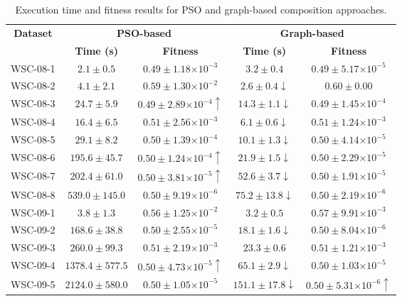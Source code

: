 \documentclass{llncs}
\providecommand{\e}[1]{\ensuremath{\times 10^{#1}}}
\begin{document}
\begin{table}[h]
\centering
\caption{Execution time and fitness results for PSO and graph-based composition approaches.}
\label{tab:results}
\begin{tabular}{|c|c|c|c|c|}
\hline
\multirow{2}{*}{{\bf Dataset}} & \multicolumn{2}{c|}{{\bf PSO-based}}               & \multicolumn{2}{c|}{{\bf Graph-based}}                     \\ \cline{2-5} 
                               & {\bf Time (s)}    & {\bf Fitness}                  & {\bf Time (s)}            & {\bf Fitness}                  \\ \hline
WSC-08-1                       & $2.1 \pm 0.5$     & $0.49 \pm 1.18\e{-3}$          & $3.2 \pm 0.4$             & $0.49 \pm 5.17\e{-5}$          \\ \hline
WSC-08-2                       & $4.1 \pm 2.1$     & $0.59 \pm 1.30\e{-2}$          & $2.6 \pm 0.4 \downarrow$  & $0.60 \pm 0.00$                \\ \hline
WSC-08-3                       & $24.7 \pm 5.9$    & $0.49 \pm 2.89\e{-4} \uparrow$ & $14.3 \pm 1.1 \downarrow$ & $0.49 \pm 1.45\e{-4}$          \\ \hline
WSC-08-4                       & $16.4 \pm 6.5$    & $0.51 \pm 2.56\e{-3}$          & $6.1 \pm 0.6 \downarrow$  & $0.51 \pm 1.24\e{-3}$          \\ \hline
WSC-08-5                       & $29.1 \pm 8.2$    & $0.50 \pm 1.39\e{-4}$          & $10.1 \pm 1.3 \downarrow$ & $0.50 \pm 4.14\e{-5}$          \\ \hline
WSC-08-6                       & $195.6 \pm 45.7$  & $0.50 \pm 1.24\e{-4} \uparrow$ & $21.9 \pm 1.5 \downarrow$ & $0.50 \pm 2.29\e{-5}$          \\ \hline
WSC-08-7                       & $202.4 \pm 61.0$  & $0.50 \pm 3.81\e{-5} \uparrow$ & $52.6 \pm 3.7 \downarrow$ & $0.50 \pm 1.91\e{-5}$          \\ \hline
WSC-08-8                       & $539.0 \pm 145.0$ & $0.50 \pm 9.19\e{-6}$          & $75.2 \pm 13.8\downarrow$ & $0.50 \pm 2.19\e{-6}$          \\ \hline
WSC-09-1                       & $3.8 \pm 1.3$     & $0.56 \pm 1.25\e{-2}$          & $3.2 \pm 0.5$             & $0.57 \pm 9.91\e{-3}$          \\ \hline
WSC-09-2                       & $168.6 \pm 38.8$  & $0.50 \pm 2.55\e{-5}$          & $18.1 \pm 1.6 \downarrow$ & $0.50 \pm 8.04\e{-6}$          \\ \hline
WSC-09-3                       & $260.0 \pm 99.3$  & $0.51 \pm 2.19\e{-3}$          & $23.3 \pm 0.6$            & $0.51 \pm 1.21\e{-3}$          \\ \hline
WSC-09-4                       & $1378.4\pm 577.5$ & $0.50 \pm 4.73\e{-5} \uparrow$ & $65.1 \pm 2.9 \downarrow$ & $0.50 \pm 1.03\e{-5}$          \\ \hline
WSC-09-5                       & $2124.0\pm 580.0$ & $0.50 \pm 1.05\e{-5}$          & $151.1\pm 17.8\downarrow$ & $0.50 \pm 5.31\e{-6} \uparrow$ \\ \hline
\end{tabular}
\end{table}
\end{document}

